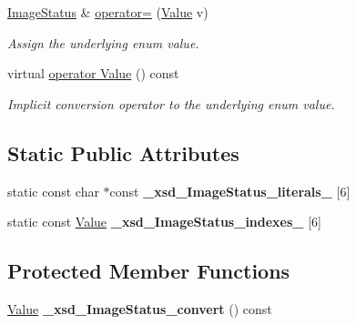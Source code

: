 \begin{DoxyCompactItemize}
\hyperlink{classopenstack_1_1xml_1_1ImageStatus}{ImageStatus} \& \hyperlink{classopenstack_1_1xml_1_1ImageStatus_ae90ce007ab324b9f9361a7d64aafa9ff}{operator=} (\hyperlink{classopenstack_1_1xml_1_1ImageStatus_a188550ace9b21da799469c453a76c0d1}{Value} v)
\begin{DoxyCompactList}\small\item\em Assign the underlying enum value. \item\end{DoxyCompactList}\item 
virtual \hyperlink{classopenstack_1_1xml_1_1ImageStatus_a139b82abacae61032a7abf0ab0529564}{operator Value} () const 
\begin{DoxyCompactList}\small\item\em Implicit conversion operator to the underlying enum value. \item\end{DoxyCompactList}\end{DoxyCompactItemize}
\subsection*{Static Public Attributes}
\begin{DoxyCompactItemize}
\item 
\hypertarget{classopenstack_1_1xml_1_1ImageStatus_ad8612d2b0f926628702507bb7b7ee3e3}{
static const char $\ast$const {\bfseries \_\-xsd\_\-ImageStatus\_\-literals\_\-} \mbox{[}6\mbox{]}}
\label{classopenstack_1_1xml_1_1ImageStatus_ad8612d2b0f926628702507bb7b7ee3e3}

\item 
\hypertarget{classopenstack_1_1xml_1_1ImageStatus_a780a709677919575b74961f7874aa72c}{
static const \hyperlink{classopenstack_1_1xml_1_1ImageStatus_a188550ace9b21da799469c453a76c0d1}{Value} {\bfseries \_\-xsd\_\-ImageStatus\_\-indexes\_\-} \mbox{[}6\mbox{]}}
\label{classopenstack_1_1xml_1_1ImageStatus_a780a709677919575b74961f7874aa72c}

\end{DoxyCompactItemize}
\subsection*{Protected Member Functions}
\begin{DoxyCompactItemize}
\item 
\hypertarget{classopenstack_1_1xml_1_1ImageStatus_a2ab94162859abaac493b00dab4005dc6}{
\hyperlink{classopenstack_1_1xml_1_1ImageStatus_a188550ace9b21da799469c453a76c0d1}{Value} {\bfseries \_\-xsd\_\-ImageStatus\_\-convert} () const }
\label{classopenstack_1_1xml_1_1ImageStatus_a2ab94162859abaac493b00dab4005dc6}

\end{DoxyCompactItemize}


